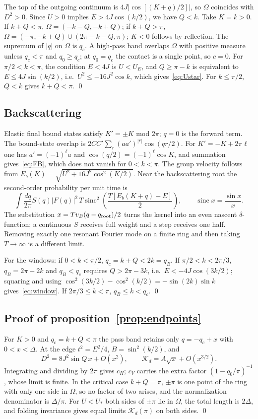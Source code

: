 \documentclass[12pt,a4paper]{article}
\theoremstyle{remark}
\newcommand{\Kd}{\mathcal{K}_d}
\newcommand{\sinc}{\operatorname{sinc}}
\newcommand{\Ustar}{U_{*}}
\begin{document}
The top of the outgoing continuum is $4J|\cos[(K+q)/2]|$, so $\Omega$ coincides with $D^2>0$. Since $U>0$ implies $E>4J\cos(k/2)$, we have $Q<k$. Take $K=k>0$. If $k+Q<\pi$, $\Omega=(-k-Q,-k+Q)$; if $k+Q>\pi$, $\Omega=(-\pi,-k+Q)\cup(2\pi-k-Q,\pi)$; $K<0$ follows by reflection. The supremum of $|q|$ on $\Omega$ is $q_c$. A high-pass band overlaps $\Omega$ with positive measure unless $q_c<\pi$ and $q_0\ge q_c$; at $q_0=q_c$ the contact is a single point, so $c=0$. For $\pi/2<k<\pi$, the condition $E<4J$ is $U<U_E$, and $Q\ge\pi-k$ is equivalent to $E\le4J\sin(k/2)$, i.e.\ $U^2\le-16J^2\cos k$, which gives~\eqref{eq:Ustar}. For $k\le\pi/2$, $Q<k$ gives $k+Q<\pi$. \qed

\subsection{Backscattering}\label{app:P5}

Elastic final bound states satisfy $K'=\pm K$ mod $2\pi$; $q=0$ is the forward term. The bound-state overlap is $2CC'\sum_r(aa')^{|r|}\cos(qr/2)$. For $K'=-K+2\pi\ell$ one has $a'=(-1)^\ell a$ and $\cos(q/2)=(-1)^\ell\cos K$, and summation gives~\eqref{eq:FB}, which does not vanish for $0<k<\pi$. The group velocity follows from $E_b(K)=\sqrt{U^2+16J^2\cos^2(K/2)}$. Near the backscattering root the second-order probability per unit time is
\begin{equation}
\int\frac{dq}{2\pi}S(q)|F(q)|^2\,T\sinc^2\!\left(\frac{T[E_b(K+q)-E]}{2}\right),\qquad\sinc x=\frac{\sin x}{x}.
\end{equation}
The substitution $x=Tv_B(q-q_{\rm root})/2$ turns the kernel into an even nascent $\delta$-function; a continuous $S$ receives full weight and a step receives one half. Removing exactly one resonant Fourier mode on a finite ring and then taking $T\to\infty$ is a different limit.

For the windows: if $0<k<\pi/2$, $q_c=k+Q<2k=q_B$. If $\pi/2<k<2\pi/3$, $q_B=2\pi-2k$ and $q_B<q_c$ requires $Q>2\pi-3k$, i.e.\ $E<-4J\cos(3k/2)$; squaring and using $\cos^2(3k/2)-\cos^2(k/2)=-\sin(2k)\sin k$ gives~\eqref{eq:window}. If $2\pi/3\le k<\pi$, $q_B\le k<q_c$. \qed

\subsection{Proof of proposition~\ref{prop:endpoints}}\label{app:P6}

For $K>0$ and $q_c=k+Q<\pi$ the pass band retains only $q=-q_c+x$ with $0<x<\Delta$. At the edge $t^2=E^2/4$, $B=\sin^2(k/2)$, and
\begin{equation}
D^2=8J^2\sin Q\,x+O(x^2),\qquad \Kd=A\sqrt{x}+O(x^{3/2}).
\end{equation}
Integrating and dividing by $2\pi$ gives $c_H$; $c_V$ carries the extra factor $(1-q_0/\pi)^{-1}$, whose limit is finite. In the critical case $k+Q=\pi$, $\pm\pi$ is one point of the ring with only one side in $\Omega$, so no factor of two arises, and the normalization denominator is $\Delta/\pi$. For $U<\Ustar$ both sides of $\pm\pi$ lie in $\Omega$, the total length is $2\Delta$, and folding invariance gives equal limits $\Kd(\pi)$ on both sides. \qed
\end{document}
